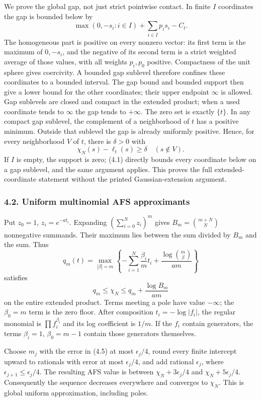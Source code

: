 \documentclass[
  10pt,
]{article}
\begin{document}
We prove the global gap, not just strict pointwise contact. In finite
\(I\) coordinates the gap is bounded below by
\[\max(0,-s_i:i\in I)+\sum_{i\in I}p_i s_i-C_t.\] The homogeneous part
is positive on every nonzero vector: its first term is the maximum of
\(0,-s_i\), and the negative of its second term is a strict weighted
average of those values, with all weights \(p_i,p_0\) positive.
Compactness of the unit sphere gives coercivity. A bounded gap sublevel
therefore confines these coordinates to a bounded interval. The gap
bound and bounded support then give a lower bound for the other
coordinates; their upper endpoint \(\infty\) is allowed. Gap sublevels
are closed and compact in the extended product; when a used coordinate
tends to \(\infty\) the gap tends to \(+\infty\). The zero set is
exactly \(\{t\}\). In any compact gap sublevel, the complement of a
neighborhood of \(t\) has a positive minimum. Outside that sublevel the
gap is already uniformly positive. Hence, for every neighborhood \(V\)
of \(t\), there is \(\delta>0\) with
\[\chi_N(s)-\ell_t(s)\ge\delta\quad(s\notin V). \tag{4.4}\] If \(I\) is
empty, the support is zero; (4.1) directly bounds every coordinate below
on a gap sublevel, and the same argument applies. This proves the full
extended-coordinate statement without the printed Gaussian-extension
argument.

\subsubsection{4.2. Uniform multinomial AFS
approximants}\label{uniform-multinomial-afs-approximants}

Put \(z_0=1\), \(z_i=e^{-at_i}\). Expanding \((\sum_{i=0}^N z_i)^m\)
gives \(B_m=\binom{m+N}{N}\) nonnegative summands. Their maximum lies
between the sum divided by \(B_m\) and the sum. Thus
\[q_m(t)=\max_{|\beta|=m}\left\{-\sum_{i=1}^N\frac{\beta_i}{m}t_i
 +\frac{\log\binom m\beta}{am}\right\}\] satisfies
\[q_m\le\chi_N\le q_m+\frac{\log B_m}{am} \tag{4.5}\] on the entire
extended product. Terms meeting a pole have value \(-\infty\); the
\(\beta_0=m\) term is the zero floor. After composition
\(t_i=-\log|f_i|\), the regular monomial is \(\prod f_i^{\beta_i}\) and
its log coefficient is \(1/m\). If the \(f_i\) contain generators, the
terms \(\beta_i=1\), \(\beta_0=m-1\) contain those generators
themselves.

Choose \(m_j\) with the error in (4.5) at most \(\epsilon_j/4\), round
every finite intercept upward to rationals with error at most
\(\epsilon_j/4\), and add rational \(\epsilon_j\), where
\(\epsilon_{j+1}\le\epsilon_j/4\). The resulting AFS value is between
\(\chi_N+3\epsilon_j/4\) and \(\chi_N+5\epsilon_j/4\). Consequently the
sequence decreases everywhere and converges to \(\chi_N\). This is
global uniform approximation, including poles.
\end{document}
